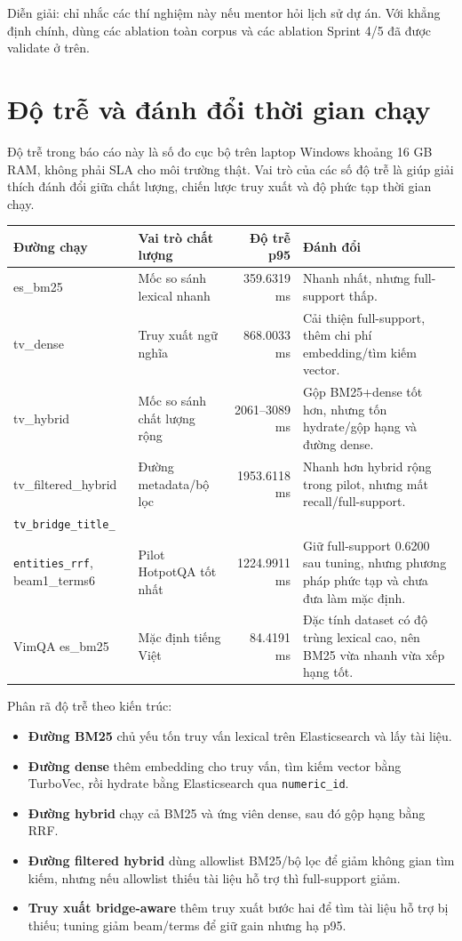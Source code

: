 \documentclass[11pt,a4paper]{article}
\newcommand{\bridgecell}{\texttt{tv\_bridge\_title\_}\\\texttt{entities\_rrf}}
\begin{document}
Diễn giải: chỉ nhắc các thí nghiệm này nếu mentor hỏi lịch sử dự án. Với khẳng định chính, dùng các
ablation toàn corpus và các ablation Sprint 4/5 đã được validate ở trên.

\section{Độ trễ và đánh đổi thời gian chạy}

Độ trễ trong báo cáo này là số đo cục bộ trên laptop Windows khoảng 16 GB RAM, không phải
SLA cho môi trường thật. Vai trò của các số độ trễ là giúp giải thích đánh đổi giữa chất lượng,
chiến lược truy xuất và độ phức tạp thời gian chạy.

\begin{tabularx}{\textwidth}{>{\ttfamily\raggedright\arraybackslash}p{} Y r Y}
\toprule
Đường chạy & Vai trò chất lượng & Độ trễ p95 & Đánh đổi \\
\midrule
es\_bm25 & Mốc so sánh lexical nhanh & 359.6319 ms & Nhanh nhất, nhưng full-support thấp. \\
tv\_dense & Truy xuất ngữ nghĩa & 868.0033 ms & Cải thiện full-support, thêm chi phí embedding/tìm kiếm vector. \\
tv\_hybrid & Mốc so sánh chất lượng rộng & 2061--3089 ms & Gộp BM25+dense tốt hơn, nhưng tốn hydrate/gộp hạng và đường dense. \\
tv\_filtered\_hybrid & Đường metadata/bộ lọc & 1953.6118 ms & Nhanh hơn hybrid rộng trong pilot, nhưng mất recall/full-support. \\
\bridgecell, beam1\_terms6 & Pilot HotpotQA tốt nhất & 1224.9911 ms & Giữ full-support 0.6200 sau tuning, nhưng phương pháp phức tạp và chưa đưa làm mặc định. \\
VimQA es\_bm25 & Mặc định tiếng Việt & 84.4191 ms & Đặc tính dataset có độ trùng lexical cao, nên BM25 vừa nhanh vừa xếp hạng tốt. \\
\bottomrule
\end{tabularx}

Phân rã độ trễ theo kiến trúc:

\begin{itemize}
  \item \textbf{Đường BM25} chủ yếu tốn truy vấn lexical trên Elasticsearch và lấy tài liệu.
  \item \textbf{Đường dense} thêm embedding cho truy vấn, tìm kiếm vector bằng TurboVec, rồi hydrate bằng Elasticsearch qua \texttt{numeric\_id}.
  \item \textbf{Đường hybrid} chạy cả BM25 và ứng viên dense, sau đó gộp hạng bằng RRF.
  \item \textbf{Đường filtered hybrid} dùng allowlist BM25/bộ lọc để giảm không gian tìm kiếm, nhưng nếu allowlist thiếu tài liệu hỗ trợ thì full-support giảm.
  \item \textbf{Truy xuất bridge-aware} thêm truy xuất bước hai để tìm tài liệu hỗ trợ bị thiếu; tuning giảm beam/terms để giữ gain nhưng hạ p95.
\end{itemize}
\end{document}
